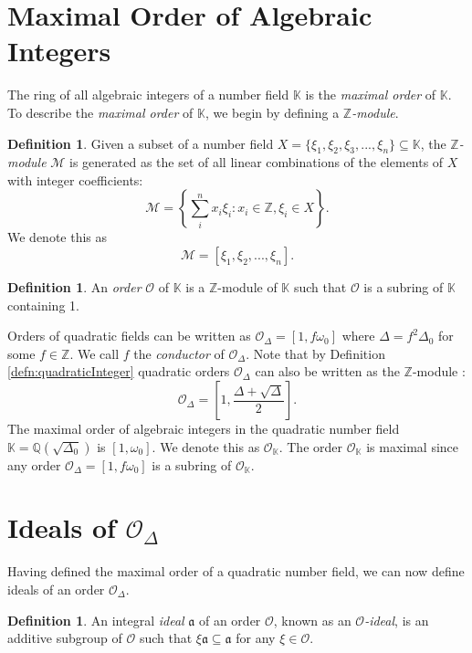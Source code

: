 \documentclass{ucalgthes1}
\theoremstyle{plain}
\theoremstyle{definition}
\newtheorem{defn}[thm]{Definition}
\newcommand{\KK}{\mathbb{K}}
\newcommand{\MM}{\mathcal{M}}
\newcommand{\OO}{\mathcal{O}}
\newcommand{\ZZ}{\mathbb{Z}}
\newcommand{\QQ}{\mathbb{Q}}
\begin{document}
\bigbreak
\section{Maximal Order of Algebraic Integers}
The ring of all algebraic integers of a number field $\KK$ is the \emph{maximal order} of $\KK$.  To describe the \emph{maximal order} of $\KK$, we begin by defining a \emph{$\ZZ$-module}.  

\begin{defn}
Given a subset of a number field $X = \{ \xi_1, \xi_2, \xi_3, ..., \xi_n \} \subseteq \KK$, the \emph{$\ZZ$-module} $\MM$ is generated as the set of all linear combinations of the elements of $X$ with integer coefficients:
\[
	\MM = \left \{ \sum_{i}^n x_i \xi_i : x_i \in \ZZ, \xi_i \in X \right \}.
\]
We denote this as
\[
	\MM = [ \xi_1, \xi_2, ..., \xi_n ].
\]
\end{defn}

\begin{defn}
An \emph{order} $\OO$ of $\KK$ is a $\ZZ$-module of $\KK$ such that $\OO$ is a subring of $\KK$ containing 1.
\end{defn}

\noindent
Orders of quadratic fields can be written as  $\OO_\Delta = [1, f\omega_0]$ where $\Delta = f^2\Delta_0$ for some $f \in \ZZ$.  We call $f$ the \emph{conductor} of $\OO_\Delta$.  Note that by Definition \ref{defn:quadraticInteger} quadratic orders $\OO_\Delta$ can also be written as  the $\ZZ$-module  \cite[p.~81]{Jac09}:
\begin{equation*}
	\OO_\Delta = \left[1, \frac{\Delta + \sqrt{\Delta}}{2} \right].
\end{equation*}
The maximal order of algebraic integers in the quadratic number field $\KK=\QQ(\sqrt{\Delta_0})$ is $[1, \omega_0]$.  We denote this as $\OO_{\KK}$.  The order $\OO_\KK$ is maximal since any order $\OO_\Delta = [1,f\omega_0]$ is a subring of $\OO_\KK$. 


\bigbreak
\section{Ideals of $\OO_\Delta$}

Having defined the maximal order of a quadratic number field, we can now define ideals of an order $\OO_\Delta$.

\begin{defn}
An integral \emph{ideal} $\mathfrak{a}$ of an order $\OO$, known as an \emph{$\OO$-ideal}, is an additive subgroup of $\OO$ such that $\xi \mathfrak{a} \subseteq \mathfrak{a}$ for any $\xi \in \OO$.
\end{defn}
\end{document}
